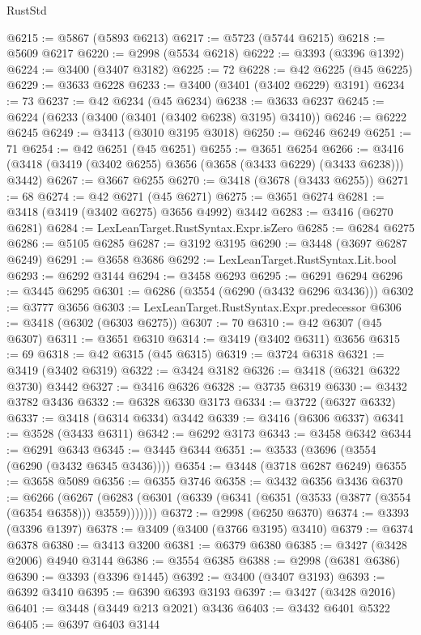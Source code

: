 \begin{lexlean}{RustStd}
\begin{coremodule}
@6215 := @5867 (@5893 @6213)
@6217 := @5723 (@5744 @6215)
@6218 := @5609 @6217
@6220 := @2998 (@5534 @6218)
@6222 := @3393 (@3396 @1392)
@6224 := @3400 (@3407 @3182)
@6225 := 72
@6228 := @42 @6225 (@45 @6225)
@6229 := @3633 @6228
@6233 := @3400 (@3401 (@3402 @6229) @3191)
@6234 := 73
@6237 := @42 @6234 (@45 @6234)
@6238 := @3633 @6237
@6245 := @6224 (@6233 (@3400 (@3401 (@3402 @6238) @3195) @3410))
@6246 := @6222 @6245
@6249 := @3413 (@3010 @3195 @3018)
@6250 := @6246 @6249
@6251 := 71
@6254 := @42 @6251 (@45 @6251)
@6255 := @3651 @6254
@6266 := @3416 (@3418 (@3419 (@3402 @6255) @3656 (@3658 (@3433 @6229) (@3433 @6238))) @3442)
@6267 := @3667 @6255
@6270 := @3418 (@3678 (@3433 @6255))
@6271 := 68
@6274 := @42 @6271 (@45 @6271)
@6275 := @3651 @6274
@6281 := @3418 (@3419 (@3402 @6275) @3656 @4992) @3442
@6283 := @3416 (@6270 @6281)
@6284 := LexLeanTarget.RustSyntax.Expr.isZero
@6285 := @6284 @6275
@6286 := @5105 @6285
@6287 := @3192 @3195
@6290 := @3448 (@3697 @6287 @6249)
@6291 := @3658 @3686
@6292 := LexLeanTarget.RustSyntax.Lit.bool
@6293 := @6292 @3144
@6294 := @3458 @6293
@6295 := @6291 @6294
@6296 := @3445 @6295
@6301 := @6286 (@3554 (@6290 (@3432 @6296 @3436)))
@6302 := @3777 @3656
@6303 := LexLeanTarget.RustSyntax.Expr.predecessor
@6306 := @3418 (@6302 (@6303 @6275))
@6307 := 70
@6310 := @42 @6307 (@45 @6307)
@6311 := @3651 @6310
@6314 := @3419 (@3402 @6311) @3656
@6315 := 69
@6318 := @42 @6315 (@45 @6315)
@6319 := @3724 @6318
@6321 := @3419 (@3402 @6319)
@6322 := @3424 @3182
@6326 := @3418 (@6321 @6322 @3730) @3442
@6327 := @3416 @6326
@6328 := @3735 @6319
@6330 := @3432 @3782 @3436
@6332 := @6328 @6330 @3173
@6334 := @3722 (@6327 @6332)
@6337 := @3418 (@6314 @6334) @3442
@6339 := @3416 (@6306 @6337)
@6341 := @3528 (@3433 @6311)
@6342 := @6292 @3173
@6343 := @3458 @6342
@6344 := @6291 @6343
@6345 := @3445 @6344
@6351 := @3533 (@3696 (@3554 (@6290 (@3432 @6345 @3436))))
@6354 := @3448 (@3718 @6287 @6249)
@6355 := @3658 @5089
@6356 := @6355 @3746
@6358 := @3432 @6356 @3436
@6370 := @6266
    (@6267 (@6283 (@6301 (@6339 (@6341 (@6351 (@3533 (@3877 (@3554 (@6354 @6358))) @3559)))))))
@6372 := @2998 (@6250 @6370)
@6374 := @3393 (@3396 @1397)
@6378 := @3409 (@3400 (@3766 @3195) @3410)
@6379 := @6374 @6378
@6380 := @3413 @3200
@6381 := @6379 @6380
@6385 := @3427 (@3428 @2006) @4940 @3144
@6386 := @3554 @6385
@6388 := @2998 (@6381 @6386)
@6390 := @3393 (@3396 @1445)
@6392 := @3400 (@3407 @3193)
@6393 := @6392 @3410
@6395 := @6390 @6393 @3193
@6397 := @3427 (@3428 @2016)
@6401 := @3448 (@3449 @213 @2021) @3436
@6403 := @3432 @6401 @5322
@6405 := @6397 @6403 @3144

\end{coremodule}
\end{lexlean}
